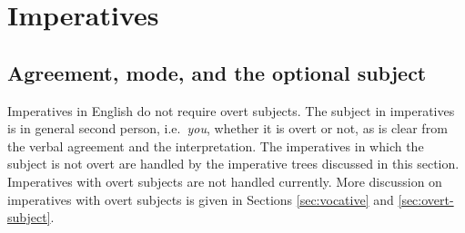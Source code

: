  
\chapter{Imperatives} 
\label{imperatives} 
 
\section{Agreement, mode, and the optional subject} 
 
Imperatives in English do not require overt subjects.  The subject in 
imperatives is in general second person, i.e.\ {\it you}, whether it is 
overt or not, as is clear from the verbal agreement and the interpretation. 
The imperatives in which the subject is not overt are handled by the 
imperative trees discussed in this section.  Imperatives with overt 
subjects are not handled currently.  More discussion on imperatives with 
overt subjects is given in Sections \ref{sec:vocative} and 
\ref{sec:overt-subject}. 
 
